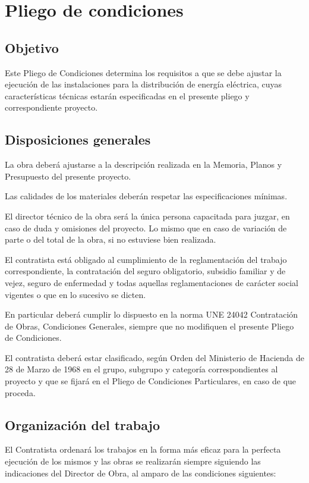 \chapter{Pliego de condiciones}
\label{ch:pliego}
\section{Objetivo}
\label{sec:pliego-objetivo}
Este Pliego de Condiciones determina los requisitos a que se debe  ajustar la ejecución de las instalaciones para la distribución de energía eléctrica, cuyas características técnicas estarán especificadas en el presente pliego y correspondiente proyecto.
\section{Disposiciones generales}
\label{sec:pliego-disposiciones}
La obra deberá ajustarse a la descripción realizada en la Memoria, Planos y Presupuesto del presente proyecto.

Las calidades de los materiales deberán respetar las especificaciones mínimas.

El director técnico de la obra será la única persona capacitada para juzgar, en caso de duda y omisiones del proyecto. Lo mismo que en caso de variación de parte o del total de la obra, si no estuviese bien realizada.

El contratista está obligado al cumplimiento de la reglamentación del trabajo correspondiente, la contratación del seguro obligatorio, subsidio familiar y de vejez, seguro de enfermedad y todas aquellas reglamentaciones de carácter social vigentes o que en lo sucesivo se dicten.  

En particular deberá cumplir lo dispuesto en la norma UNE 24042 Contratación de Obras, Condiciones Generales, siempre que no modifiquen el presente Pliego de Condiciones.  

El contratista deberá estar clasificado, según Orden del Ministerio de Hacienda de 28 de Marzo de 1968 en el grupo, subgrupo y categoría correspondientes al proyecto y que se fijará en el Pliego de Condiciones Particulares, en caso de que proceda.
\section{Organización del trabajo}
\label{sec:pliego-organizacion}
El Contratista ordenará los trabajos en la forma más eficaz para la perfecta ejecución de los mismos y las obras se realizarán siempre siguiendo las indicaciones del Director de Obra, al amparo de las condiciones siguientes:
